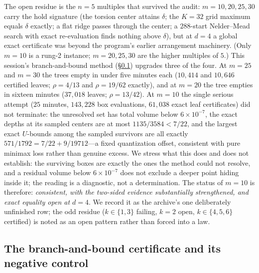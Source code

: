 The open residue is the $n=5$ multiples that survived the audit:
$m=10,20,25,30$ carry the hold signature (the torsion center attains
$\delta$; the $K=32$ grid maximum equals $\delta$ exactly; a flat ridge
passes through the center; a $288$-start Nelder--Mead search with exact
re-evaluation finds nothing above $\delta$), but at $d=4$ a global exact
certificate was beyond the program's earlier arrangement machinery.
(Only $m=10$ is a rung-2 instance; $m=20,25,30$ are the higher
multiples of $5$.) This session's branch-and-bound method
(\S\ref{sec:bb}) upgrades three of the four. At $m=25$ and $m=30$ the
trees empty in under five minutes each ($10{,}414$ and $10{,}646$
certified leaves; $\rho=4/13$ and $\rho=19/62$ exactly), and at $m=20$
the tree empties in sixteen minutes ($37{,}018$ leaves;
$\rho=13/42$). At $m=10$ the single
serious attempt ($25$ minutes, $143{,}228$ box evaluations, $61{,}038$
exact leaf certificates) did not terminate: the unresolved set has
total volume below $6\times10^{-7}$, the exact depths at its sampled
centers are at most $1135/3584<7/22$, and the largest exact $U$-bounds
among the sampled survivors are all exactly
$571/1792=7/22+9/19712$---a fixed quantization offset, consistent with
pure minimax loss rather than genuine excess. We stress what this does
and does not establish: the surviving boxes are exactly the ones the
method could not resolve, and a residual volume below $6\times10^{-7}$
does not exclude a deeper point hiding inside it; the reading is a
diagnostic, not a determination. The status of $m=10$ is therefore:
\emph{consistent, with the two-sided evidence substantially
strengthened, and exact equality open at $d=4$}.
We record it as the archive's one deliberately unfinished row; the odd
residue ($k\in\{1,3\}$ failing, $k=2$ open, $k\in\{4,5,6\}$
certified) is noted as an open pattern rather than forced into a law.

\subsection{The branch-and-bound certificate and its negative control}
\label{sec:bb}

